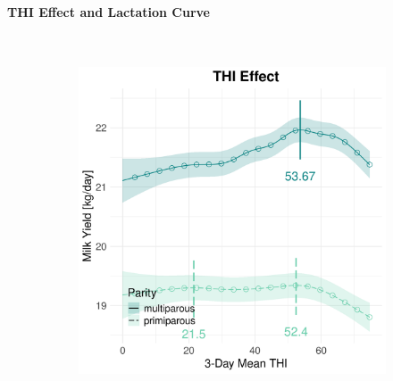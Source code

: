 \paragraph{THI Effect and Lactation Curve} \quad \\
\begin{figure}[H]
    \centering
    \begin{subfigure}[b]{0.45\textwidth}
        \centering
        \includegraphics[width=\textwidth]{thesis/figures/models/milk/before2010/bs_milk_before2010/bs_milk_before2010_marginal_thi_milk_combined.png}
    \end{subfigure}
    \hspace{0.05\textwidth} %
    \begin{subfigure}[b]{0.45\textwidth}
        \centering

\end{subfigure}
\end{figure}
